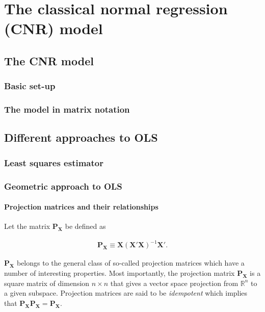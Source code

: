 \chapter[The CNR model]{The classical normal regression (CNR) model}\label{chap_ClassNormReg}

\section{The CNR model}
\subsection{Basic set-up}
\subsection{The model in matrix notation}

\section{Different approaches to OLS}
\subsection{Least squares estimator}

\subsection{Geometric approach to OLS}
\subsubsection{Projection matrices and their relationships}
Let the matrix $\boldsymbol{P_{X}}$ be defined as

\begin{eqnarray}
\boldsymbol{P_{X}} \equiv \boldsymbol{X}(\boldsymbol{X}'\boldsymbol{X})^{-1}\boldsymbol{X}'.\label{eqn_CNR_Px}
\end{eqnarray}

$\boldsymbol{P_{X}}$ belongs to the general class of so-called projection matrices which have a number of interesting properties. Most importantly, the projection matrix $\boldsymbol{P_{X}}$ is a square matrix of dimension $n \times n$ that gives a vector space projection from $\mathbb{R}^{n}$ to a given subspace. Projection matrices are said to be \emph{idempotent} which implies that $\boldsymbol{P_{X}}\boldsymbol{P_{X}}=\boldsymbol{P_{X}}$.

